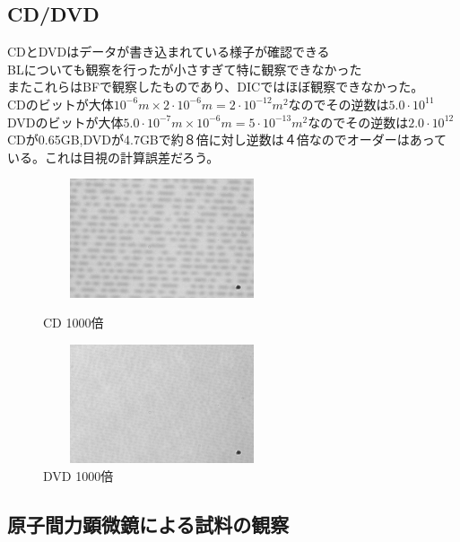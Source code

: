 \documentclass{jsarticle}
\begin{document}
\subsection{CD/DVD}
CDとDVDはデータが書き込まれている様子が確認できる\\
BLについても観察を行ったが小さすぎて特に観察できなかった\\
またこれらはBFで観察したものであり、DICではほぼ観察できなかった。\\
CDのビットが大体$10^{-6}m\times2\cdot10^{-6}m=2\cdot10^{-12}m^{2}$なのでその逆数は$5.0\cdot10^{11}$\\
DVDのビットが大体$5.0\cdot10^{-7}m\times10^{-6}m=5\cdot10^{-13}m^{2}$なのでその逆数は$2.0\cdot10^{12}$\\
CDが0.65GB,DVDが4.7GBで約８倍に対し逆数は４倍なのでオーダーはあっている。これは目視の計算誤差だろう。
\begin{figure}[htbp]
 \begin{minipage}{0.5\hsize}
  \begin{center}
   \includegraphics[width=70mm,height=35mm]{pictures/CD_x1000_BF.bmp}
  \end{center}
  \caption{CD 1000倍}
  \label{fig:one}
 \end{minipage}
 \begin{minipage}{0.5\hsize}
  \begin{center}
   \includegraphics[width=70mm,height=35mm]{pictures/DVD_x1000_BF.bmp}
  \end{center}
  \caption{DVD 1000倍}
  \label{fig:two}
 \end{minipage}
\end{figure}
\subsection{原子間力顕微鏡による試料の観察}
\end{document}
